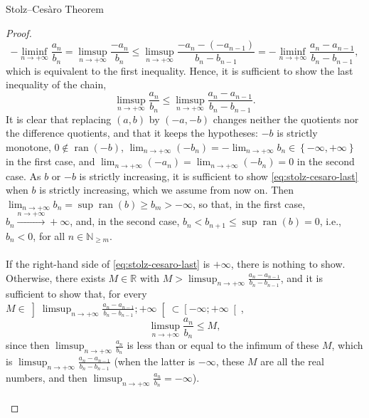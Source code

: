 \begin{appendixitem}{Stolz–Cesàro Theorem}
\begin{proof}
        \[
            -\liminf_{n \to +\infty} \frac{a_n}{b_n} = \limsup_{n \to +\infty} \frac{-a_n}{b_n} \leq \limsup_{n \to +\infty} \frac{-a_n-\left(-a_{n-1}\right)}{b_n-b_{n-1}} = -\liminf_{n \to +\infty} \frac{a_n-a_{n-1}}{b_n-b_{n-1}},
        \]
        which is equivalent to the first inequality. Hence, it is sufficient to show the last inequality of the chain,
        \begin{equation}
            \limsup_{n \to +\infty} \frac{a_n}{b_n} \leq \limsup_{n \to +\infty} \frac{a_n-a_{n-1}}{b_n-b_{n-1}}. \label{eq:stolz-cesaro-last}
        \end{equation}
        It is clear that replacing \( \left(a, b\right) \) by \( \left(-a, -b\right) \) changes neither the quotients nor the difference quotients, and that it keeps the hypotheses: \( -b \) is strictly monotone, \( 0 \notin \operatorname{ran}\left(-b\right) \), \( \lim_{n \to +\infty} \left(-b_n\right) = -\lim_{n \to +\infty} b_n \in \left\{-\infty, +\infty\right\} \) in the first case, and \( \lim_{n \to +\infty} \left(-a_n\right) = \lim_{n \to +\infty} \left(-b_n\right) = 0 \) in the second case. As \( b \) or \( -b \) is strictly increasing, it is sufficient to show \eqref{eq:stolz-cesaro-last} when \( b \) is strictly increasing, which we assume from now on. Then \( \lim_{n \to +\infty} b_n = \sup \operatorname{ran}\left(b\right) \geq b_m > -\infty \), so that, in the first case, \( b_n \overset{n \to +\infty}{\longrightarrow} +\infty \), and, in the second case, \( b_n < b_{n+1} \leq \sup \operatorname{ran}\left(b\right) = 0 \), i.e., \( b_n < 0 \), for all \( n \in \mathbb{N}_{\geq m} \).
        \\\\
        If the right-hand side of \eqref{eq:stolz-cesaro-last} is \( +\infty \), there is nothing to show. Otherwise, there exists \( M \in \mathbb{R} \) with \( M > \limsup_{n \to +\infty} \frac{a_n-a_{n-1}}{b_n-b_{n-1}} \), and it is sufficient to show that, for every \( M \in \left]\limsup_{n \to +\infty} \frac{a_n-a_{n-1}}{b_n-b_{n-1}}; +\infty\right[ \subset \left[-\infty;+\infty\right[ \),
        \[
            \limsup_{n \to +\infty} \frac{a_n}{b_n} \leq M,
        \]
        since then \( \limsup_{n \to +\infty} \frac{a_n}{b_n} \) is less than or equal to the infimum of these \( M \), which is \( \limsup_{n \to +\infty} \frac{a_n-a_{n-1}}{b_n-b_{n-1}} \) (when the latter is \( -\infty \), these \( M \) are all the real numbers, and then \( \limsup_{n \to +\infty} \frac{a_n}{b_n} = -\infty \)).
        \\\\

\end{proof}
\end{appendixitem}
